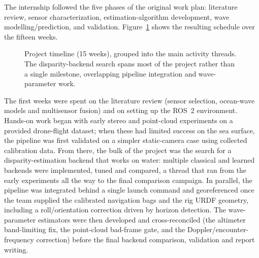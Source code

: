 The internship followed the five phases of the original work plan: literature review, sensor characterization, estimation-algorithm development, wave modelling/prediction, and validation. Figure~\ref{fig:gantt} shows the resulting schedule over the fifteen weeks.

\begin{figure}[H]
	\centering
	\caption{Project timeline (15 weeks), grouped into the main activity threads. The disparity-backend search spans most of the project rather than a single milestone, overlapping pipeline integration and wave-parameter work.}
	\label{fig:gantt}
\end{figure}

The first weeks were spent on the literature review (sensor selection, ocean-wave models and multisensor fusion) and on setting up the ROS~2 environment. Hands-on work began with early stereo and point-cloud experiments on a provided drone-flight dataset; when these had limited success on the sea surface, the pipeline was first validated on a simpler static-camera case using collected calibration data. From there, the bulk of the project was the search for a disparity-estimation backend that works on water: multiple classical and learned backends were implemented, tuned and compared, a thread that ran from the early experiments all the way to the final comparison campaign. In parallel, the pipeline was integrated behind a single launch command and georeferenced once the team supplied the calibrated navigation bags and the rig URDF geometry, including a roll/orientation correction driven by horizon detection. The wave-parameter estimators were then developed and cross-reconciled (the altimeter band-limiting fix, the point-cloud bad-frame gate, and the Doppler/encounter-frequency correction) before the final backend comparison, validation and report writing.
